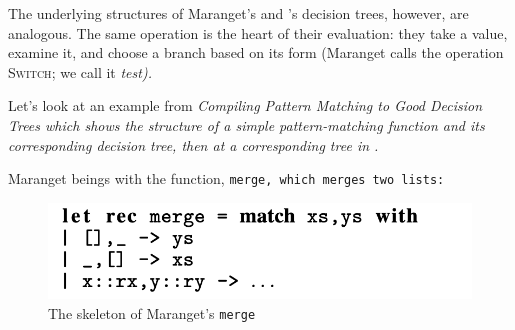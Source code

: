 \documentclass[manuscript,screen,review, 12pt, nonacm]{acmart}
\begin{document}
    The underlying structures of Maranget's and \D's decision trees, however,
    are analogous. The same operation is the heart of their evaluation: they
    take a value, examine it, and choose a branch based on its form (Maranget
    calls the operation \textsc{Switch}; we call it \it{test}). 

    Let's look at an example from \it{Compiling Pattern Matching to Good
    Decision Trees} which shows the structure of a simple pattern-matching
    function and its corresponding decision tree, then at a corresponding tree
    in \D. 

    Maranget beings with the function, \tt{merge}, which merges two lists: 

    \begin{figure}[H]
        \includegraphics[scale=0.7]{../tex/images/merge.png}
        \caption{The skeleton of Maranget's \tt{merge}}
    \end{figure}




\end{document}
